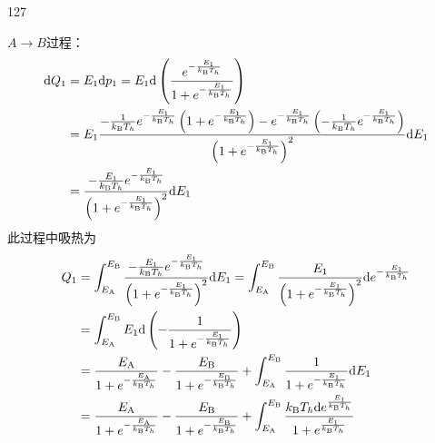 \begin{solution}{127}
\begin{subsolution}
        $A \to B$过程：
        \begin{align}
            \mathrm{d} Q _ {1} &= E _ {1} \mathrm{d} p _ {1} = E _ {1} \mathrm{d} \left(\frac {e ^ {- \frac {E _ {1}}{k _ {\mathrm{B}} T _ {h}}}}{1 + e ^ {- \frac {E _ {1}}{k _ {\mathrm{B}} T _ {h}}}}\right) \notag \\
            &= E _ {1} \frac {- \frac {1}{k _ {\mathrm{B}} T _ {h}} e ^ {- \frac {E _ {1}}{k _ {\mathrm{B}} T _ {h}}} \left(1 + e ^ {- \frac {E _ {1}}{k _ {\mathrm{B}} T _ {h}}}\right) - e ^ {- \frac {E _ {1}}{k _ {\mathrm{B}} T _ {h}}} \left(- \frac {1}{k _ {\mathrm{B}} T _ {h}} e ^ {- \frac {E _ {1}}{k _ {\mathrm{B}} T _ {h}}}\right)}{\left(1 + e ^ {- \frac {E _ {1}}{k _ {\mathrm{B}} T _ {h}}}\right) ^ {2}} \mathrm{d} E _ {1} \notag \\
            &= \frac {- \frac {E _ {1}}{k _ {\mathrm{B}} T _ {h}} e ^ {- \frac {E _ {1}}{k _ {\mathrm{B}} T _ {h}}}}{\left(1 + e ^ {- \frac {E _ {1}}{k _ {\mathrm{B}} T _ {h}}}\right) ^ {2}} \mathrm{d} E _ {1} \label{eq:17.s127}
        \end{align}
        此过程中吸热为
        \begin{align}
            Q _ {1} &= \int_ {E _ {\mathrm{A}}} ^ {E _ {\mathrm{B}}} \frac {- \frac {E _ {1}}{k _ {\mathrm{B}} T _ {h}} e ^ {- \frac {E _ {1}}{k _ {\mathrm{B}} T _ {h}}}}{\left(1 + e ^ {- \frac {E _ {1}}{k _ {\mathrm{B}} T _ {h}}}\right) ^ {2}} \mathrm{d} E _ {1} = \int_ {E _ {\mathrm{A}}} ^ {E _ {\mathrm{B}}} \frac {E _ {1}}{\left(1 + e ^ {- \frac {E _ {1}}{k _ {\mathrm{B}} T _ {h}}}\right) ^ {2}} \mathrm{d} e ^ {- \frac {E _ {1}}{k _ {\mathrm{B}} T _ {h}}} \notag \\
            &= \int_ {E _ {\mathrm{A}}} ^ {E _ {\mathrm{B}}} E _ {1} \mathrm{d} \left(- \frac {1}{1 + e ^ {- \frac {E _ {1}}{k _ {\mathrm{B}} T _ {h}}}}\right) \notag \\
            &= \frac {E _ {\mathrm{A}}}{1 + e ^ {- \frac {E _ {\mathrm{A}}}{k _ {\mathrm{B}} T _ {h}}}} - \frac {E _ {\mathrm{B}}}{1 + e ^ {- \frac {E _ {\mathrm{B}}}{k _ {\mathrm{B}} T _ {h}}}} + \int_ {E _ {\mathrm{A}}} ^ {E _ {\mathrm{B}}} \frac {1}{1 + e ^ {- \frac {E _ {1}}{k _ {\mathrm{B}} T _ {h}}}} \mathrm{d} E _ {1} \notag \\
            &= \frac {E _ {\mathrm{A}}}{1 + e ^ {- \frac {E _ {\mathrm{A}}}{k _ {\mathrm{B}} T _ {h}}}} - \frac {E _ {\mathrm{B}}}{1 + e ^ {- \frac {E _ {\mathrm{B}}}{k _ {\mathrm{B}} T _ {h}}}} + \int_ {E _ {\mathrm{A}}} ^ {E _ {\mathrm{B}}} \frac {k _ {\mathrm{B}} T _ {h} \mathrm{d} e ^ {\frac {E _ {1}}{k _ {\mathrm{B}} T _ {h}}}}{1 + e ^ {\frac {E _ {1}}{k _ {\mathrm{B}} T _ {h}}}} \notag \\

\end{align}
\end{subsolution}
\end{solution}
